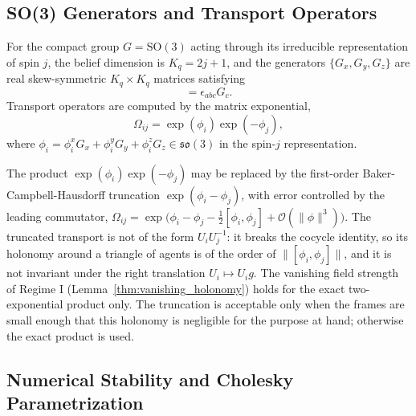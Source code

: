 \subsection{SO(3) Generators and Transport Operators}

For the compact group $G = \mathrm{SO}(3)$ acting through its irreducible representation of spin $j$, the belief dimension is $K_q = 2j + 1$, and the generators $\{G_x, G_y, G_z\}$ are real skew-symmetric $K_q \times K_q$ matrices satisfying
\begin{equation}
[G_a, G_b] = \epsilon_{abc} G_c.
\end{equation}
Transport operators are computed by the matrix exponential,
\begin{equation}
\Omega_{ij} = \exp(\phi_i) \exp(-\phi_j),
\end{equation}
where $\phi_i = \phi_i^x G_x + \phi_i^y G_y + \phi_i^z G_z \in \mathfrak{so}(3)$ in the spin-$j$ representation.

The product $\exp(\phi_i)\exp(-\phi_j)$ may be replaced by the first-order Baker-Campbell-Hausdorff truncation $\exp(\phi_i - \phi_j)$, with error controlled by the leading commutator, $\Omega_{ij} = \exp\big(\phi_i - \phi_j - \tfrac{1}{2}[\phi_i, \phi_j] + \mathcal{O}(\|\phi\|^3)\big)$. The truncated transport is not of the form $U_iU_j^{-1}$: it breaks the cocycle identity, so its holonomy around a triangle of agents is of the order of $\|[\phi_i, \phi_j]\|$, and it is not invariant under the right translation $U_i \mapsto U_i g$. The vanishing field strength of Regime I (Lemma~\ref{thm:vanishing_holonomy}) holds for the exact two-exponential product only. The truncation is acceptable only when the frames are small enough that this holonomy is negligible for the purpose at hand; otherwise the exact product is used.

\subsection{Numerical Stability and Cholesky Parametrization}

